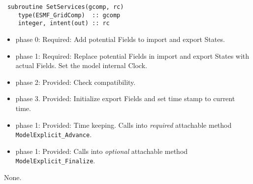 \begin{verbatim} subroutine SetServices(gcomp, rc)
    type(ESMF_GridComp)  :: gcomp
    integer, intent(out) :: rc
\end{verbatim} 

\begin{itemize}
\item phase 0: {\sc Required:} Add potential Fields to import and export States.
\item phase 1: {\sc Required:} Replace potential Fields in import and export States with actual Fields. Set the model internal Clock.
\item phase 2: {\sc Provided:} Check compatibility.
\item phase 3. {\sc Provided:} Initialize export Fields and set time stamp to current time.
\end{itemize}

\begin{itemize}
\item phase 1: {\sc Provided:} Time keeping. Calls into {\em required} attachable method {\tt ModelExplicit\_Advance}.
\end{itemize}

\begin{itemize}
\item phase 1: {\sc Provided:} Calls into {\em optional} attachable method {\tt ModelExplicit\_Finalize}.
\end{itemize}

{\sc None.}

